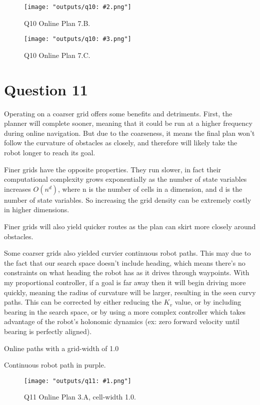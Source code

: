 \documentclass[11pt]{article}
\begin{document}
\begin{figure}[H]
    \centering
    \texttt{[image: "outputs/q10: \#2.png"]}
    \caption{Q10 Online Plan 7.B.}
\end{figure}

\begin{figure}[H]
    \centering
    \texttt{[image: "outputs/q10: \#3.png"]}
    \caption{Q10 Online Plan 7.C.}
\end{figure}

\section{Question 11}

Operating on a coarser grid offers some benefits and detriments. First, the planner will complete sooner, meaning that it could be run at a higher frequency during online navigation. But due to the coarseness, it means the final plan won't follow the curvature of obstacles as closely, and therefore will likely take the robot longer to reach its goal.

Finer grids have the opposite properties. They run slower, in fact their computational complexity grows exponentially as the number of state variables increases $O(n^d)$, where n is the number of cells in a dimension, and d is the number of state variables. So increasing the grid density can be extremely costly in higher dimensions.

Finer grids will also yield quicker routes as the plan can skirt more closely around obstacles.

Some coarser grids also yielded curvier continuous robot paths. This may due to the fact that our search space doesn't include heading, which means there's no constraints on what heading the robot has as it drives through waypoints. With my proportional controller, if a goal is far away then it will begin driving more quickly, meaning the radius of curvature will be larger, resulting in the seen curvy paths. This can be corrected by either reducing the $K_v$ value, or by including bearing in the search space, or by using a more complex controller which takes advantage of the robot's holonomic dynamics (ex: zero forward velocity until bearing is perfectly aligned).

Online paths with a grid-width of 1.0

Continuous robot path in purple.
\begin{figure}[H]
    \centering
    \texttt{[image: "outputs/q11: \#1.png"]}
    \caption{Q11 Online Plan 3.A, cell-width 1.0.}
\end{figure}
\end{document}
